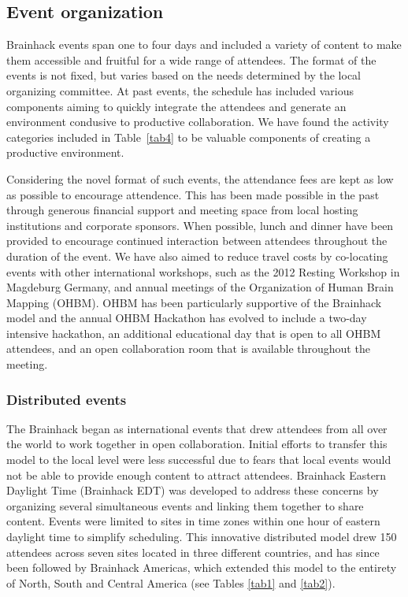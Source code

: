 \documentclass[11pt]{bmc_article_s50}
\begin{document}
\subsection{Event organization}

Brainhack events span one to four days and included a variety of content to make them accessible and fruitful for a wide range of attendees. The format of the events is not fixed, but varies based on the needs determined by the local organizing committee. At past events, the schedule has included various components aiming to quickly integrate the attendees and generate an environment condusive to productive collaboration. We have found the activity categories included in Table~\ref{tab4} to be valuable components of creating a productive environment. 

Considering the novel format of such events, the attendance fees are kept as low as possible to encourage attendence. This has been made possible in the past through generous financial support and meeting space from local hosting institutions and corporate sponsors. When possible, lunch and dinner have been provided to encourage continued interaction between attendees throughout the duration of the event. We have also aimed to reduce travel costs by co-locating events with other international workshops, such as the 2012 Resting Workshop in Magdeburg Germany, and annual meetings of the Organization of Human Brain Mapping (OHBM). OHBM has been particularly supportive of the Brainhack model and the annual OHBM Hackathon has evolved to include a two-day intensive hackathon, an additional educational day that is open to all OHBM attendees, and an open collaboration room that is available throughout the meeting.

\subsubsection{Distributed events}

The Brainhack began as international events that drew attendees from all over the world to work together in open collaboration. Initial efforts to transfer this model to the local level were less successful due to fears that local events would not be able to provide enough content to attract attendees. Brainhack Eastern Daylight Time (Brainhack EDT) was developed to address these concerns by organizing several simultaneous events and linking them together to share content. Events were limited to sites in time zones within one hour of eastern daylight time to simplify scheduling. This innovative distributed model drew 150 attendees across seven sites located in three different countries, and has since been followed by Brainhack Americas, which extended this model to the entirety of North, South and Central America (see Tables \ref{tab1} and \ref{tab2}).
\end{document}

